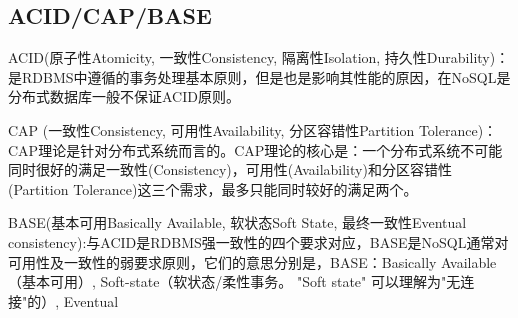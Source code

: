 \documentclass[../../../interview-questions.tex]{subfiles}
\begin{document}
\subsection{ACID/CAP/BASE}

ACID(原子性Atomicity, 一致性Consistency, 隔离性Isolation, 持久性Durability)：是RDBMS中遵循的事务处理基本原则，但是也是影响其性能的原因，在NoSQL是分布式数据库一般不保证ACID原则。

CAP (一致性Consistency, 可用性Availability, 分区容错性Partition Tolerance)：CAP理论是针对分布式系统而言的。CAP理论的核心是：一个分布式系统不可能同时很好的满足一致性(Consistency)，可用性(Availability)和分区容错性(Partition Tolerance)这三个需求，最多只能同时较好的满足两个。

BASE(基本可用Basically Available, 软状态Soft State, 最终一致性Eventual consistency):与ACID是RDBMS强一致性的四个要求对应，BASE是NoSQL通常对可用性及一致性的弱要求原则，它们的意思分别是，BASE：Basically Available（基本可用）, Soft-state（软状态/柔性事务。 "Soft state" 可以理解为"无连接"的）, Eventual
\end{document}
